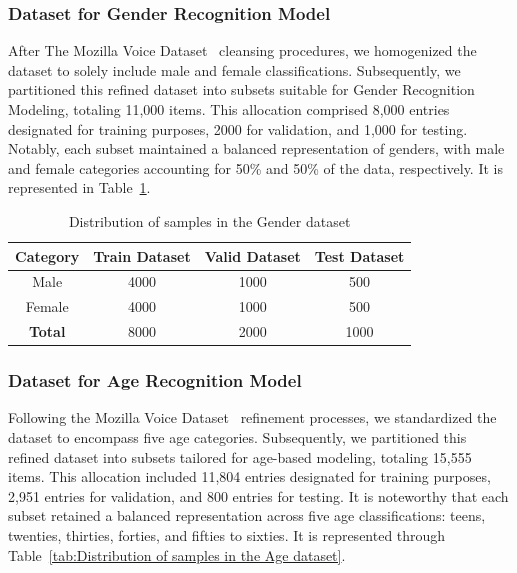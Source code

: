 \documentclass[conference, 10pt,onecolumn]{IEEEtran}
\begin{document}
\subsubsection{Dataset for Gender Recognition Model}
After The Mozilla Voice Dataset~\cite{mozilla_voice} cleansing procedures, we homogenized the dataset to solely include male and female classifications. Subsequently, we partitioned this refined dataset into subsets suitable for Gender Recognition Modeling, totaling 11,000 items. This allocation comprised 8,000 entries designated for training purposes, 2000 for validation, and 1,000  for testing. Notably, each subset maintained a balanced representation of genders, with male and female categories accounting for 50\% and 50\% of the data, respectively. It is represented in Table~\ref{tab:Distribution of samples in the Gender dataset}.

\begin{table}[htbp]
    \centering
    \begin{tabular}{|c|ccc|}
    \hline
    \textbf{Category} & \textbf{Train Dataset} & \textbf{Valid Dataset} & \textbf{Test Dataset}\\
    \hline
    Male & 4000 & 1000 & 500 \\
    Female & 4000 & 1000 & 500 \\
    \hline
    \textbf{Total} & 8000 & 2000 & 1000 \\
    \hline
    \end{tabular}
    \caption{Distribution of samples in the Gender dataset}
    \label{tab:Distribution of samples in the Gender dataset}
\end{table}

\subsubsection{Dataset for Age Recognition Model}
 Following the Mozilla Voice Dataset~\cite{mozilla_voice} refinement processes, we standardized the dataset to encompass five age categories. Subsequently, we partitioned this refined dataset into subsets tailored for age-based modeling, totaling 15,555 items. This allocation included 11,804 entries designated for training purposes, 2,951 entries for validation, and 800 entries for testing. It is noteworthy that each subset retained a balanced representation across five age classifications: teens, twenties, thirties, forties, and fifties to sixties. It is represented through Table~\ref{tab:Distribution of samples in the Age dataset}.
\end{document}
